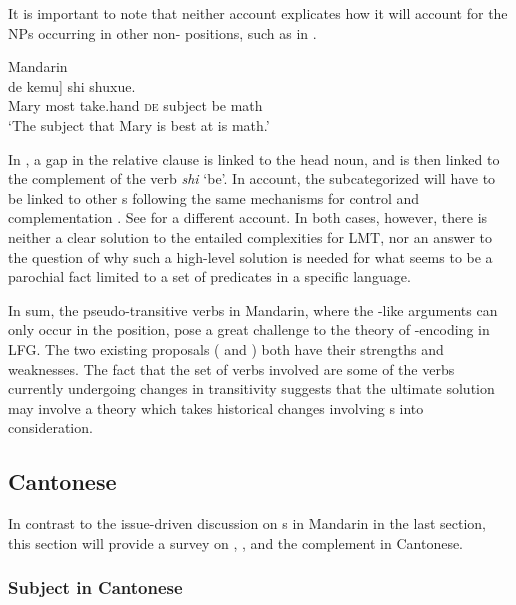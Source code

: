 \documentclass[output=paper,chinesefont,hidelinks]{langscibook}
\begin{document}
\noindent It is important to note that neither account explicates how it will account for the NPs occurring in other non-{\OBJ} positions, such as in .

\ea%
    \label{ex:Sinitic:15}Mandarin\\
    \gll [[Mali  zui  nashou] de  kemu] shi  shuxue.\\
         {\db\db}Mary  most   take.hand    \textsc{de} subject  be   math\\
    \glt `The subject that Mary is best at is math.'
    \z

\noindent In , a gap in the relative clause is linked to the head noun, and is then linked to the complement of the verb \textit{shi} `be'. In  account, the subcategorized {\SUBJ} will have to be linked to other {\GF}s following the same mechanisms for control and complementation \citep{bresnan1982control-complementation}. See \citet{Her2010} for a different account. In both cases, however, there is neither a clear solution to the entailed complexities for LMT, nor an answer to the question of why such a high-level solution is needed for what seems to be a parochial fact limited to a set of predicates in a specific language.

  In sum, the pseudo-transitive verbs in Mandarin, where the {\OBJ}-like arguments can only occur in the {\TOPIC} position, pose a great challenge to the theory of {\GF}-encoding in LFG. The two existing proposals (\citealt{Huang1989b} and \citealt{Her2010}) both have their strengths and weaknesses. The fact that the set of verbs involved are some of the verbs currently undergoing changes in transitivity \citep{JiangHuang2022} suggests that the ultimate solution may involve a theory which takes historical changes involving {\GF}s into consideration.

\subsection{Cantonese}
\label{sec:Sinitic:3.1.2}

In contrast to the issue-driven discussion on {\GF}s in Mandarin in the last section, this section will provide a survey on {\SUBJ} \citep{Lee2003}, {\OBJ} \citep{Lam2008}, and the complement \citep{BodomoLee2003,Lee2002} in Cantonese.

\subsubsection{Subject in Cantonese}
\label{sec:Sinitic:3.1.2.1}
\end{document}
